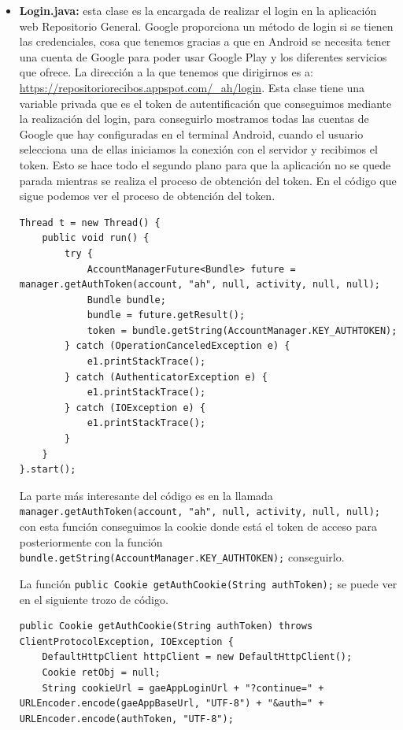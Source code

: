 \begin{itemize}

\item \textbf{Login.java:} esta clase es la encargada de realizar el login en la aplicación web Repositorio General. Google proporciona un método de login si se tienen las credenciales, cosa que tenemos gracias a que en Android se necesita tener una cuenta de Google para poder usar Google Play y los diferentes servicios que ofrece. La dirección a la que tenemos que dirigirnos es a: \url{https://repositoriorecibos.appspot.com/\_ah/login}. Esta clase tiene una variable privada que es el token de autentificación que conseguimos mediante la realización del login, para conseguirlo mostramos todas las cuentas de Google que hay configuradas en el terminal Android, cuando el usuario selecciona una de ellas iniciamos la conexión con el servidor y recibimos el token. Esto se hace todo el segundo plano para que la aplicación no se quede parada mientras se realiza el proceso de obtención del token. En el código que sigue podemos ver el proceso de obtención del token.

\begin{lstlisting}[style=Java]
Thread t = new Thread() {
	public void run() {
		try {
			AccountManagerFuture<Bundle> future = manager.getAuthToken(account, "ah", null, activity, null, null);
			Bundle bundle;
			bundle = future.getResult();
			token = bundle.getString(AccountManager.KEY_AUTHTOKEN);
		} catch (OperationCanceledException e) {
			e1.printStackTrace();
		} catch (AuthenticatorException e) {
			e1.printStackTrace();
		} catch (IOException e) {
			e1.printStackTrace();
		}
	}
}.start();
\end{lstlisting} 

La parte más interesante del código es en la llamada \lstinline{manager.getAuthToken(account, "ah", null, activity, null, null);} con esta función conseguimos la cookie donde está el token de acceso para posteriormente con la función \lstinline{bundle.getString(AccountManager.KEY_AUTHTOKEN);} conseguirlo.

La función \lstinline{public Cookie getAuthCookie(String authToken);} se puede ver en el siguiente trozo de código.

\begin{lstlisting}[style=Java]
public Cookie getAuthCookie(String authToken) throws ClientProtocolException, IOException {
	DefaultHttpClient httpClient = new DefaultHttpClient();
	Cookie retObj = null;
	String cookieUrl = gaeAppLoginUrl + "?continue=" + URLEncoder.encode(gaeAppBaseUrl, "UTF-8") + "&auth=" + URLEncoder.encode(authToken, "UTF-8");
	

\end{lstlisting}
\end{itemize}
